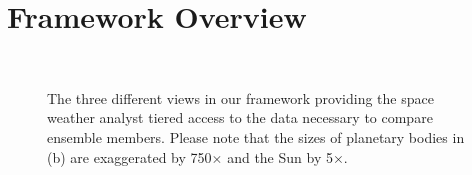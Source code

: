 \documentclass{vgtc}                          %
\begin{document}
\section{Framework Overview}
\begin{figure}
\\
\caption{The three different views in our framework providing the space weather analyst tiered access to the data necessary to compare ensemble members. Please note that the sizes of planetary bodies in (b) are exaggerated by 750$\times$ and the Sun by 5$\times$.}
\label{fig:system}
\end{figure}
\end{document}
